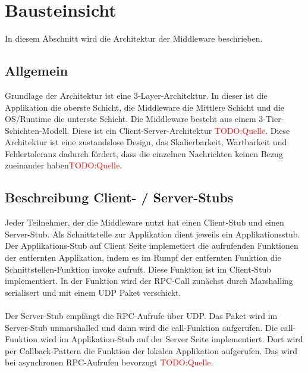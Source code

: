 \chapter{Bausteinsicht}
In diesem Abschnitt wird die Architektur der Middleware beschrieben.

\section{Allgemein}
Grundlage der Architektur ist eine 3-Layer-Architektur. In dieser ist die Applikation die oberste Schicht, die Middleware die Mittlere Schicht und die OS/Runtime die unterste Schicht. Die Middleware besteht aus einem 3-Tier-Schichten-Modell. Diese ist ein Client-Server-Architektur \textcolor{red}{TODO:Quelle}. Diese Architektur ist eine zustandslose Design, das Skalierbarkeit, Wartbarkeit und Fehlertoleranz dadurch  fördert, dass die einzelnen Nachrichten keinen Bezug zueinander haben\textcolor{red}{TODO:Quelle}.

\section{Beschreibung Client- / Server-Stubs}
Jeder Teilnehmer, der die Middleware nutzt hat einen Client-Stub und einen Server-Stub. Als Schnittstelle zur Applikation dient jeweils ein Applikationsstub. Der Applikations-Stub auf Client Seite implemetiert die aufrufenden Funktionen der entfernten Applikation, indem es im Rumpf der entfernten Funktion die Schnittstellen-Funktion \glqq{}invoke\grqq{} aufruft. Diese Funktion ist im Client-Stub implementiert. In der Funktion wird der RPC-Call zunächst durch Marshalling serialisert und mit einem UDP Paket verschickt.\\\\
Der Server-Stub empfängt die RPC-Aufrufe über UDP. Das Paket wird im Server-Stub unmarshalled und dann wird die \glqq{}call\grqq{}-Funktion aufgerufen. Die \glqq{}call\grqq{}-Funktion wird im Applikation-Stub auf der Server Seite implementiert. Dort wird per Callback-Pattern die Funktion der lokalen Applikation aufgerufen. Das wird bei asynchronen RPC-Aufrufen bevorzugt \textcolor{red}{TODO:Quelle}.

